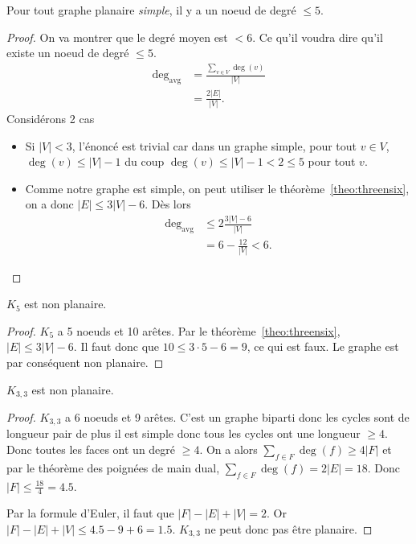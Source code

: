 \begin{mytheo}
  Pour tout graphe planaire \emph{simple}, il y a un noeud de degré $\leq 5$.
  \begin{proof}
    On va montrer que le degré moyen est $< 6$.
    Ce qu'il voudra dire qu'il existe un noeud de degré $\leq 5$.
    \begin{align*}
      \deg_{\mathrm{avg}} & = \frac{\sum_{v\in V} \deg(v)}{|V|}\\
                          & = \frac{2|E|}{|V|}.
    \end{align*}
    Considérons 2 cas
    \begin{itemize}
      \item Si $|V| < 3$, l'énoncé est trivial car dans un graphe simple,
        pour tout $v \in V$, $\deg(v) \leq |V|-1$ du coup
        $\deg(v) \leq |V| - 1 < 2 \leq 5$ pour tout $v$.
      \item
        Comme notre graphe est simple,
        on peut utiliser le théorème~\ref{theo:threensix},
        on a donc $|E| \leq 3|V| - 6$.
        Dès lors
        \begin{align*}
          \deg_{\mathrm{avg}} & \leq 2\frac{3|V|-6}{|V|}\\
                              & = 6 - \frac{12}{|V|} < 6.
        \end{align*}
    \end{itemize}
  \end{proof}
\end{mytheo}

\begin{mycorr}
  $K_5$ est non planaire.
  \begin{proof}
    $K_5$ a 5 noeuds et 10 arêtes.
    Par le théorème~\ref{theo:threensix}, $|E| \leq 3|V| - 6$.
    Il faut donc que $10 \leq 3 \cdot 5 - 6 = 9$, ce qui est faux.
    Le graphe est par conséquent non planaire.
  \end{proof}
\end{mycorr}

\begin{mycorr}
  $K_{3,3}$ est non planaire.
  \begin{proof}
    $K_{3,3}$ a 6 noeuds et 9 arêtes.
    C'est un graphe biparti donc les cycles sont de longueur pair de plus il est simple donc tous les cycles ont une longueur $\geq 4$.
    Donc toutes les faces ont un degré $\geq 4$.
    On a alors $\sum_{f \in F} \deg(f) \geq 4|F|$ et par le théorème des poignées de main dual, $\sum_{f \in F} \deg(f) = 2|E| = 18$.
    Donc $|F| \leq \frac{18}{4} = 4.5$.

    Par la formule d'Euler, il faut que
    $|F| - |E| + |V| = 2$.
    Or $|F| - |E| + |V| \leq 4.5 - 9 + 6 = 1.5$.
    $K_{3,3}$ ne peut donc pas être planaire.
  \end{proof}
\end{mycorr}

